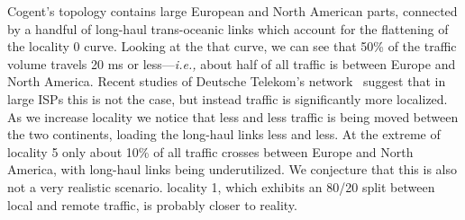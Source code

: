 \documentclass[12pt, letterpaper]{article}
\begin{document}
Cogent's topology contains large European and North American parts,
connected by a handful of long-haul trans-oceanic links which account
for the flattening of the {\sc locality 0} curve. Looking at the that
curve, we can see that 50\% of the traffic volume travels 20 ms or
less---{\em i.e.,} about half of all traffic is between Europe and
North America. Recent studies of Deutsche Telekom's
network~\cite{schuller2017traffic} suggest that in large ISPs this is
not the case, but instead traffic is significantly more localized. As
we increase locality we notice that less and less traffic is being
moved between the two continents, loading the long-haul links less and
less. At the extreme of {\sc locality 5} only about 10\% of all
traffic crosses between Europe and North America, with long-haul links
being underutilized. We conjecture that this is also not a very
realistic scenario. {\sc locality 1}, which exhibits an 80/20 split
between local and remote traffic, is probably closer to reality.

\medskip
 


\end{document}
